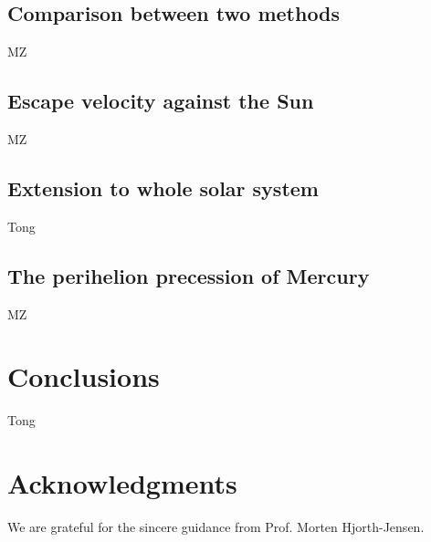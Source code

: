\documentclass{article}
\begin{document}
	\subsection{Comparison between two methods}
	MZ

	\subsection{Escape velocity against the Sun}
	MZ
	
	\subsection{Extension to whole solar system}
	Tong
	
	\subsection{The perihelion precession of Mercury}
	MZ
	
\section{Conclusions}\label{conclude}
Tong
	
	\section*{Acknowledgments}
	We are grateful for the sincere guidance from Prof. Morten Hjorth-Jensen. 
	
	\nocite{*} 
	
	
\end{document}
